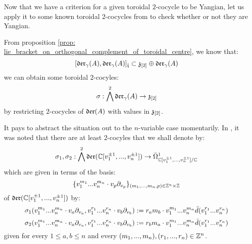         Now that we have a criterion for a given toroidal $2$-cocycle to be Yangian, let us apply it to some known toroidal $2$-cocycles from \cite{billig_energy_momentum_tensor} to check whether or not they are Yangian. 
        \begin{example} \label{example: yangian_cocycles_(counter)_examples}
            From proposition \ref{prop: lie_bracket_on_orthogonal_complement_of_toroidal_centre}, we know that:
                $$[\mathfrak{der}_{\gamma}(A), \mathfrak{der}_{\gamma}(A)]_{\hat{\mathfrak{t}}} \subset \mathfrak{z}_{[2]} \oplus \mathfrak{der}_{\gamma}(A)$$
            we can obtain some toroidal $2$-cocyles:
                $$\sigma: \bigwedge^2 \mathfrak{der}_{\gamma}(A) \to \mathfrak{z}_{[2]}$$
            by restricting $2$-cocycles of $\mathfrak{der}(A)$ with values in $\mathfrak{z}_{[2]}$.

            It pays to abstract the situation out to the $n$-variable case momentarily. In \cite[p. 5, below Equation 1.3]{billig_energy_momentum_tensor}, it was noted that there are at least $2$-cocyles that we shall denote by:
                $$\sigma_1, \sigma_2: \bigwedge^2 \mathfrak{der}(\mathbb{C}[v_1^{\pm 1}, ..., v_n^{\pm 1}]) \to \bar{\Omega}^1_{\mathbb{C}[v_1^{\pm 1}, ..., v_n^{\pm 1}]/\mathbb{C}}$$
            which are given in terms of the basis:
                $$\{ v_1^{m_1} ... v_n^{m_n} \cdot v_p \del_{v_p} \}_{(m_1, ..., m_n, p) \in \Z^n \x \Z}$$
            of $\mathfrak{der}(\mathbb{C}[v_1^{\pm 1}, ..., v_n^{\pm 1}])$ by:
                $$\sigma_1(v_1^{m_1} ... v_n^{m_n} \cdot v_a \partial_{v_a}, v_1^{r_1} ... v_n^{r_n} \cdot v_b \partial_{v_b}) := r_a m_b \cdot v_1^{m_1} ... v_n^{m_n} \bar{d}( v_1^{r_1} ... v_n^{r_n} )$$
                $$\sigma_2(v_1^{m_1} ... v_n^{m_n} \cdot v_a \partial_{v_a}, v_1^{r_1} ... v_n^{r_n} \cdot v_b \partial_{v_b}) := r_b m_a \cdot v_1^{m_1} ... v_n^{m_n} \bar{d}( v_1^{r_1} ... v_n^{r_n} )$$
            given for every $1 \leq a, b \leq n$ and every $(m_1, ..., m_n), (r_1, ..., r_n) \in \mathbb{Z}^n$. 


\end{example}

